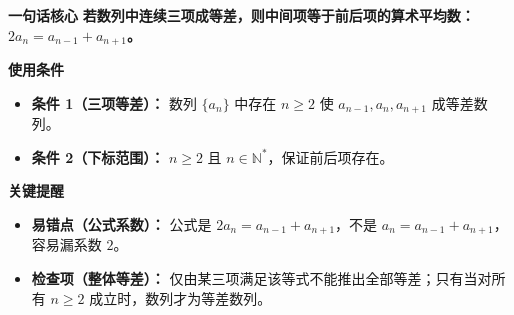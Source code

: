 \begin{summarybox}
	\textbf{\textcolor{CSummary}{一句话核心}}
	\textbf{若数列中连续三项成等差，则中间项等于前后项的算术平均数：$2a_n = a_{n-1}+a_{n+1}$。}

	\medskip
	\textbf{\textcolor{CSummary}{使用条件}}
	\begin{itemize}[leftmargin=*, itemsep=0.5em, topsep=0.4em]
		\item \textbf{条件 1（三项等差）：} 数列 $\{a_n\}$ 中存在 $n\ge 2$ 使 $a_{n-1},a_n,a_{n+1}$ 成等差数列。
		\item \textbf{条件 2（下标范围）：} $n\ge 2$ 且 $n\in\mathbb{N}^{*}$，保证前后项存在。
	\end{itemize}

	\medskip
	\textbf{\textcolor{CSummary}{关键提醒}}
	\begin{itemize}[leftmargin=*, itemsep=0.5em, topsep=0.4em]
		\item \textbf{易错点（公式系数）：} 公式是 $2a_n = a_{n-1}+a_{n+1}$，不是 $a_n = a_{n-1}+a_{n+1}$，容易漏系数 $2$。
		\item \textbf{检查项（整体等差）：} 仅由某三项满足该等式不能推出全部等差；只有当对所有 $n\ge 2$ 成立时，数列才为等差数列。
	\end{itemize}

\end{summarybox}
